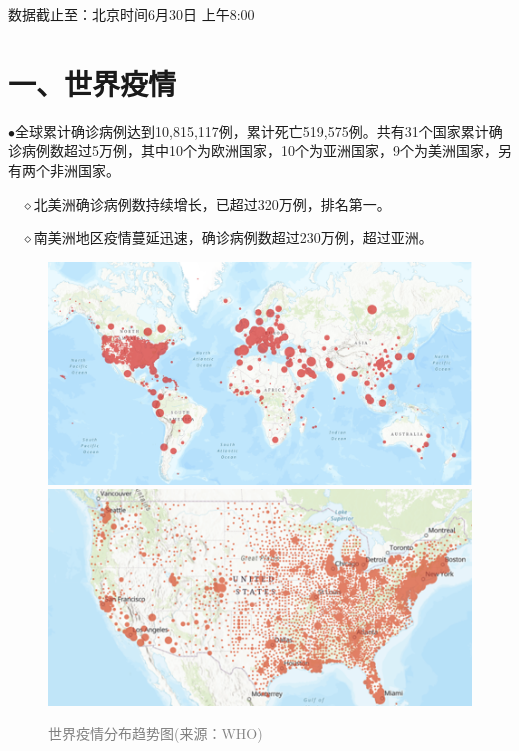 \documentclass[
]{article}
\begin{document}
\begin{Large}
{数据截止至：北京时间6月30日 上午8:00}
\end{Large}

\vspace{-7mm}

\hypertarget{section-2}{%
\section{\texorpdfstring{\textcolor{glaucous}{\Huge 一、世界疫情}}{}}\label{section-2}}

\vspace{-5mm}

\(\bullet\)全球累计确诊病例达到10,815,117例，累计死亡519,575例。共有31个国家累计确诊病例数超过5万例，其中10个为欧洲国家，10个为亚洲国家，9个为美洲国家，另有两个非洲国家。

\(\quad\)\(\diamond\)北美洲确诊病例数持续增长，已超过320万例，排名第一。

\(\quad\)\(\diamond\)南美洲地区疫情蔓延迅速，确诊病例数超过230万例，超过亚洲。

\begin{figure}[H]
\caption{\textcolor{grey}{世界疫情分布趋势图(来源：WHO)}} %
\centering
\includegraphics[]{./input/covid1.png} %
\includegraphics[]{./input/covid4.png}
\label{} %
\end{figure}
\end{document}
